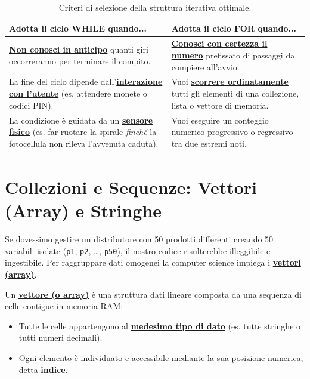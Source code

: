 \begin{table}[htbp]
\centering
\small
\begin{tabular}{|p{7cm}|p{7cm}|}
\hline
\rowcolor{PiazzaPrimary!15}
\textbf{Adotta il ciclo WHILE quando...} & \textbf{Adotta il ciclo FOR quando...} \\
\hline
\textbf{\underline{Non conosci in anticipo}} quanti giri occorreranno per terminare il compito. & \textbf{\underline{Conosci con certezza il numero}} prefissato di passaggi da compiere all'avvio. \\
\hline
La fine del ciclo dipende dall'\textbf{\underline{interazione con l'utente}} (es. attendere monete o codici PIN). & Vuoi \textbf{\underline{scorrere ordinatamente}} tutti gli elementi di una collezione, lista o vettore di memoria. \\
\hline
La condizione è guidata da un \textbf{\underline{sensore fisico}} (es. far ruotare la spirale \emph{finché} la fotocellula non rileva l'avvenuta caduta). & Vuoi eseguire un conteggio numerico progressivo o regressivo tra due estremi noti. \\
\hline
\end{tabular}
\caption{Criteri di selezione della struttura iterativa ottimale.}
\label{tab:while-vs-for}
\end{table}

\section{Collezioni e Sequenze: Vettori (Array) e Stringhe}

Se dovessimo gestire un distributore con 50 prodotti differenti creando 50 variabili isolate (\texttt{p1}, \texttt{p2}, \dots, \texttt{p50}), il nostro codice risulterebbe illeggibile e ingestibile. Per raggruppare dati omogenei la computer science impiega i \textbf{\underline{vettori (array)}}.

\begin{concetto}
Un \textbf{\underline{vettore (o array)}} è una struttura dati lineare composta da una sequenza di celle contigue in memoria RAM:
\begin{itemize}
  \item Tutte le celle appartengono al \textbf{\underline{medesimo tipo di dato}} (es. tutte stringhe o tutti numeri decimali).
  \item Ogni elemento è individuato e accessibile mediante la sua posizione numerica, detta \textbf{\underline{indice}}.
\end{itemize}
\end{concetto}

